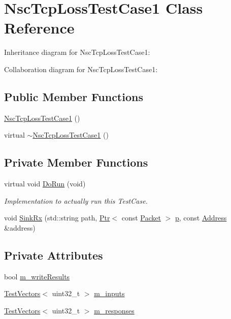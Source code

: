 \hypertarget{classNscTcpLossTestCase1}{}\section{Nsc\+Tcp\+Loss\+Test\+Case1 Class Reference}
\label{classNscTcpLossTestCase1}


Inheritance diagram for Nsc\+Tcp\+Loss\+Test\+Case1\+:


Collaboration diagram for Nsc\+Tcp\+Loss\+Test\+Case1\+:
\subsection*{Public Member Functions}
\begin{DoxyCompactItemize}
\item 
\hyperlink{classNscTcpLossTestCase1_ac432f1fe3f22f2db19e5aa6bd6811ad8}{Nsc\+Tcp\+Loss\+Test\+Case1} ()
\item 
virtual \hyperlink{classNscTcpLossTestCase1_acec57eebc35ca34bd8591d702fb62954}{$\sim$\+Nsc\+Tcp\+Loss\+Test\+Case1} ()
\end{DoxyCompactItemize}
\subsection*{Private Member Functions}
\begin{DoxyCompactItemize}
\item 
virtual void \hyperlink{classNscTcpLossTestCase1_ab2e9a06924e6dffa3f335d64c54e2a0e}{Do\+Run} (void)
\begin{DoxyCompactList}\small\item\em Implementation to actually run this Test\+Case. \end{DoxyCompactList}\item 
void \hyperlink{classNscTcpLossTestCase1_a228873a62423d2b73357603765935d64}{Sink\+Rx} (std\+::string path, \hyperlink{classns3_1_1Ptr}{Ptr}$<$ const \hyperlink{classns3_1_1Packet}{Packet} $>$ \hyperlink{lte__link__budget__x2__handover__measures_8m_ac9de518908a968428863f829398a4e62}{p}, const \hyperlink{classns3_1_1Address}{Address} \&address)
\end{DoxyCompactItemize}
\subsection*{Private Attributes}
\begin{DoxyCompactItemize}
\item 
bool \hyperlink{classNscTcpLossTestCase1_ae447c37356e0d5e4fe47ff37057fa346}{m\+\_\+write\+Results}
\item 
\hyperlink{classns3_1_1TestVectors}{Test\+Vectors}$<$ uint32\+\_\+t $>$ \hyperlink{classNscTcpLossTestCase1_afe2e1f944fcb15c5a689b48a37dc5c78}{m\+\_\+inputs}
\item 
\hyperlink{classns3_1_1TestVectors}{Test\+Vectors}$<$ uint32\+\_\+t $>$ \hyperlink{classNscTcpLossTestCase1_a8d7a9c86893918e88a071e5ab3899751}{m\+\_\+responses}
\end{DoxyCompactItemize}
